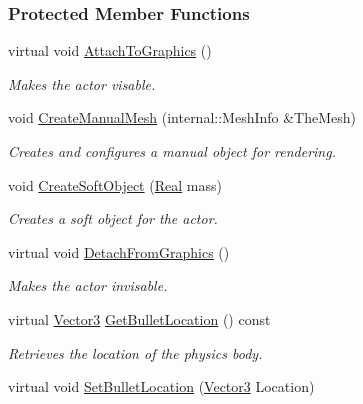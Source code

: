 \subsubsection*{Protected Member Functions}
\begin{DoxyCompactItemize}
\item 
virtual void \hyperlink{classMezzanine_1_1ActorSoft_af2e618dd176d910834f146c62efe8f19}{AttachToGraphics} ()
\begin{DoxyCompactList}\small\item\em Makes the actor visable. \item\end{DoxyCompactList}\item 
void \hyperlink{classMezzanine_1_1ActorSoft_ad725517ab3a22ef8953e3e003d11551c}{CreateManualMesh} (internal::MeshInfo \&TheMesh)
\begin{DoxyCompactList}\small\item\em Creates and configures a manual object for rendering. \item\end{DoxyCompactList}\item 
void \hyperlink{classMezzanine_1_1ActorSoft_ab0ee1ceadedb3d92295cce649749cb7a}{CreateSoftObject} (\hyperlink{namespaceMezzanine_a726731b1a7df72bf3583e4a97282c6f6}{Real} mass)
\begin{DoxyCompactList}\small\item\em Creates a soft object for the actor. \item\end{DoxyCompactList}\item 
virtual void \hyperlink{classMezzanine_1_1ActorSoft_a3ec90b87480ba28553656eb10552f6d6}{DetachFromGraphics} ()
\begin{DoxyCompactList}\small\item\em Makes the actor invisable. \item\end{DoxyCompactList}\item 
virtual \hyperlink{classMezzanine_1_1Vector3}{Vector3} \hyperlink{classMezzanine_1_1ActorSoft_a7d6f49acc1bf286fd46fb33a8c2798e4}{GetBulletLocation} () const 
\begin{DoxyCompactList}\small\item\em Retrieves the location of the physics body. \item\end{DoxyCompactList}\item 
virtual void \hyperlink{classMezzanine_1_1ActorSoft_a65115824bacb62ad58a68cf3d7fc8840}{SetBulletLocation} (\hyperlink{classMezzanine_1_1Vector3}{Vector3} Location)

\end{DoxyCompactItemize}
